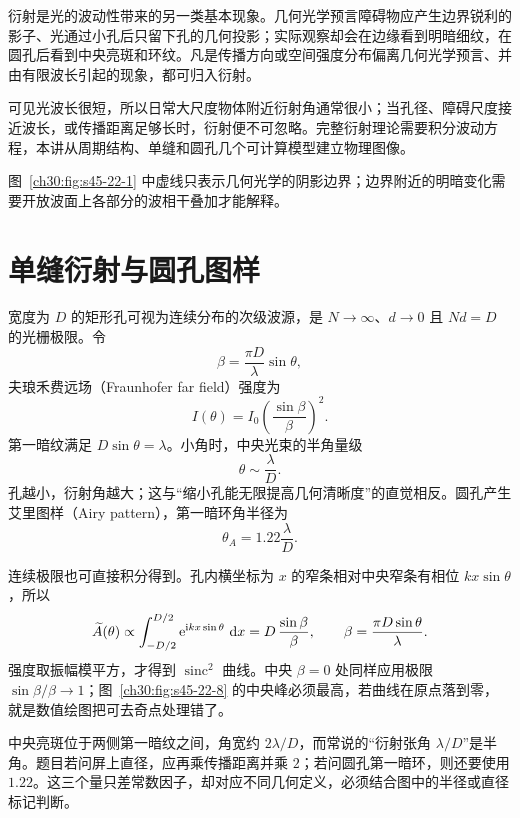衍射是光的波动性带来的另一类基本现象。几何光学预言障碍物应产生边界锐利的影子、光通过小孔后只留下孔的几何投影；实际观察却会在边缘看到明暗细纹，在圆孔后看到中央亮斑和环纹。凡是传播方向或空间强度分布偏离几何光学预言、并由有限波长引起的现象，都可归入衍射。

可见光波长很短，所以日常大尺度物体附近衍射角通常很小；当孔径、障碍尺度接近波长，或传播距离足够长时，衍射便不可忽略。完整衍射理论需要积分波动方程，本讲从周期结构、单缝和圆孔几个可计算模型建立物理图像。

\BasicDiffractionPanel
图~\ref{ch30:fig:s45-22-1} 中虚线只表示几何光学的阴影边界；边界附近的明暗变化需要开放波面上各部分的波相干叠加才能解释。



\section{单缝衍射与圆孔图样}



宽度为 $D$ 的矩形孔可视为连续分布的次级波源，是 $N\to\infty$、$d\to0$ 且 $Nd=D$ 的光栅极限。令
\[
 \beta=\frac{\pi D}{\lambda}\sin\theta,
\]
夫琅禾费远场（Fraunhofer far field）强度为
\begin{equation}
 I(\theta)=I_0\left(\frac{\sin\beta}{\beta}\right)^2.
\end{equation}
第一暗纹满足 $D\sin\theta=\lambda$。小角时，中央光束的半角量级
\begin{equation}
 \theta\sim\frac{\lambda}{D}.
\end{equation}
孔越小，衍射角越大；这与“缩小孔能无限提高几何清晰度”的直觉相反。圆孔产生艾里图样（Airy pattern），第一暗环角半径为
\begin{equation}
 \theta_A=1.22\frac{\lambda}{D}.
\end{equation}

连续极限也可直接积分得到。孔内横坐标为 $x$ 的窄条相对中央窄条有相位 $kx\sin\theta$，所以
\[
 \widetilde A(\theta)\propto
 \int_{-D/2}^{D/2}\mathrm e^{\mathrm ikx\sin\theta}\,\mathop{}\!\mathrm d x
 =D\,\frac{\sin\beta}{\beta},
 \qquad \beta=\frac{\pi D\sin\theta}{\lambda}.
\]
强度取振幅模平方，才得到 $\operatorname{sinc}^2$ 曲线。中央 $\beta=0$ 处同样应用极限 $\sin\beta/\beta\to1$；图~\ref{ch30:fig:s45-22-8} 的中央峰必须最高，若曲线在原点落到零，就是数值绘图把可去奇点处理错了。

中央亮斑位于两侧第一暗纹之间，角宽约 $2\lambda/D$，而常说的“衍射张角 $\lambda/D$”是半角。题目若问屏上直径，应再乘传播距离并乘 $2$；若问圆孔第一暗环，则还要使用 $1.22$。这三个量只差常数因子，却对应不同几何定义，必须结合图中的半径或直径标记判断。

